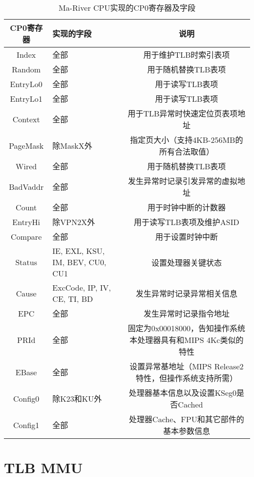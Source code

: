 \begin{table}[htbp]
\centering
\caption{Ma-River CPU实现的CP0寄存器及字段}
\label{fig:enter-label}
\begin{tabular}{c|m{3.5cm}<{\centering}|c}
\hline  %
\textbf{CP0寄存器} & \textbf{实现的字段} & \textbf{说明}\\
\hline
Index & 全部 & 用于维护TLB时索引表项\\
Random & 全部 & 用于随机替换TLB表项\\
EntryLo0 & 全部 & 用于读写TLB表项\\
EntryLo1 & 全部 & 用于读写TLB表项\\
Context & 全部 & 用于TLB异常时快速定位页表项地址\\
PageMask & 除MaskX外 & 指定页大小（支持4KB-256MB的所有合法取值）\\
Wired & 全部 & 用于随机替换TLB表项 \\
BadVaddr & 全部 & 发生异常时记录引发异常的虚拟地址\\
Count & 全部 & 用于时钟中断的计数器 \\
EntryHi & 除VPN2X外 & 用于读写TLB表项及维护ASID\\
Compare & 全部 & 用于设置时钟中断\\
Status & IE, EXL, KSU, IM, BEV, CU0, CU1 & 设置处理器关键状态\\
Cause & ExcCode, IP, IV, CE, TI, BD & 发生异常时记录异常相关信息\\
EPC & 全部 & 发生异常时记录指令地址\\
PRId & 全部 & 固定为0x00018000，告知操作系统本处理器具有和MIPS 4Kc类似的特性\\
EBase & 全部 & 设置异常基地址（MIPS Release2特性，但操作系统支持所需）\\
Config0 & 除K23和KU外 & 处理器基本信息以及设置KSeg0是否Cached\\
Config1 & 全部 & 处理器Cache、FPU和其它部件的基本参数信息\\
\hline

\end{tabular}

\end{table}

\section{TLB MMU}

